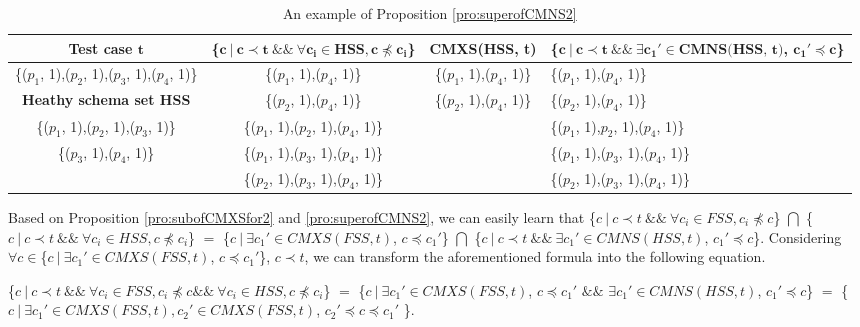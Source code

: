 \documentclass{sig-alternate-05-2015}
\begin{document}
{{\begin{table}[ht]
  \centering
  \setlength{\tabcolsep}{2pt}
  \caption{An example of Proposition \ref{pro:superofCMNS2}}
    \begin{tabular}{|c|c|c|C{5cm}|}
    \hline
  \textbf{  Test case $\textbf{t}$} & \textbf{ \{$\textbf{c}\ |\ \textbf{c} \prec \textbf{t}\ \&\&\ \forall \textbf{c}_{\textbf{i}} \in \textbf{HSS}, \textbf{c} \npreceq \textbf{c}_{\textbf{i}} $\} }& \textbf{  CMXS(HSS, t)} & \textbf{\{$ \textbf{c}\ |\ \textbf{c} \prec \textbf{t} \ \&\& \ \exists \textbf{c}_{\textbf{1}}' \in \textbf{CMNS(HSS, t)}$, $\textbf{c}_{\textbf{1}}' \preceq \textbf{c}$\}}\\\hline
    \{($p_{1}$, 1),($p_{2}$, 1),($p_{3}$, 1),($p_{4}$, 1)\}  & \{($p_{1}$, 1),($p_{4}$, 1)\} & \{($p_{1}$, 1),($p_{4}$, 1)\} & \{($p_{1}$, 1),($p_{4}$, 1)\}\\ 
      \textbf{Heathy schema set HSS}  & \{($p_{2}$, 1),($p_{4}$, 1)\} & \{($p_{2}$, 1),($p_{4}$, 1)\} & \{($p_{2}$, 1),($p_{4}$, 1)\} \\
     \{($p_{1}$, 1),($p_{2}$, 1),($p_{3}$, 1)\}         &\{($p_{1}$, 1),($p_{2}$, 1),($p_{4}$, 1)\}  &  &  \{($p_{1}$, 1),$p_{2}$, 1),($p_{4}$, 1)\}   \\
     \{($p_{3}$, 1),($p_{4}$, 1)\}         &\{($p_{1}$, 1),($p_{3}$, 1),($p_{4}$, 1)\}    &  &  \{($p_{1}$, 1),($p_{3}$, 1),($p_{4}$, 1)\}  \\
                         &\{($p_{2}$, 1),($p_{3}$, 1),($p_{4}$, 1)\}   &  & \{($p_{2}$, 1),($p_{3}$, 1),($p_{4}$, 1)\}   \\ \hline
    \end{tabular}%
  \label{examleOfCMNSPro2}%
\end{table}%


Based on Proposition \ref{pro:subofCMXSfor2} and \ref{pro:superofCMNS2}, we can easily learn that \{$c\ |\ c \prec t\ \&\&\ \forall c_{i} \in FSS, c_{i} \npreceq c $\} $\bigcap$ \{$c\ |\ c \prec t\ \&\&\ \forall c_{i} \in HSS, c \npreceq c_{i} $\}  $=$  \{$ c\ |\ \exists c_{1}' \in CMXS(FSS, t)$, $c \preceq c_{1}'$\} $\bigcap$  \{$ c\ |\ c \prec t \ \&\& \ \exists c_{1}' \in CMNS(HSS, t)$, $c_{1}' \preceq c$\}. Considering $\forall c \in $\{$ c\ |\ \exists c_{1}' \in CMXS(FSS, t)$, $c \preceq c_{1}'$\}, $c \prec t$, we can transform the aforementioned formula into the following equation.

\{$c\ |\ c \prec t\ \&\&\ \forall c_{i} \in FSS, c _{i} \npreceq c \&\&\ \forall c_{i} \in HSS, c \npreceq c_{i}  $\} $=$  \{$ c\ |\ \exists c_{1}' \in CMXS(FSS, t)$, $c \preceq c_{1}'$ $\&\&$ $\exists c_{1}' \in CMNS(HSS, t)$, $c_{1}' \preceq c$\} $=$  \{$ c\ |\ \exists c_{1}' \in CMXS(FSS, t), c_{2}' \in CMXS(FSS, t)$, $c_{2}' \preceq c \preceq c_{1}'$ \}.

}}
\end{document}
